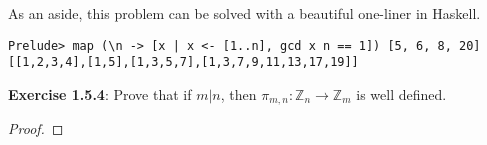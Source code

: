 \documentclass[a4paper]{article}
\begin{document}
\begin{myparindent}{0pt}
As an aside, this problem can be solved with a beautiful one-liner in Haskell. \
\begin{verbatim}
Prelude> map (\n -> [x | x <- [1..n], gcd x n == 1]) [5, 6, 8, 20]
[[1,2,3,4],[1,5],[1,3,5,7],[1,3,7,9,11,13,17,19]]
\end{verbatim}

\textbf{Exercise 1.5.4}:
Prove that if $m|n$, then $\pi_{m, n}: \mathbb{Z}_n \rightarrow \mathbb{Z}_m$ is well defined.

\begin{proof}
\end{proof}

\end{myparindent}
\end{document}
